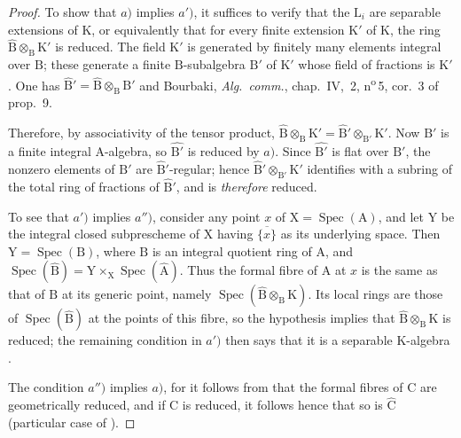 \begin{proof}
\renewcommand{\qedsymbol}{}
To show that $a)$ implies $a')$, it suffices to verify that the $\mathrm{L}_i$ are separable extensions of $\mathrm{K}$, or equivalently  that for every finite extension $\mathrm{K}'$ of $\mathrm{K}$, the ring $\widehat{\mathrm{B}}\otimes_\mathrm{B}\mathrm{K}'$ is reduced. The field $\mathrm{K}'$ is generated by finitely many elements integral over $\mathrm{B}$; these generate a finite $\mathrm{B}$-subalgebra $\mathrm{B}'$ of $\mathrm{K}'$ whose field of fractions is $\mathrm{K}'$. One has $\widehat{\mathrm{B}}'=\widehat{\mathrm{B}}\otimes_\mathrm{B}\mathrm{B}'$
 and Bourbaki, \emph{Alg.\ comm.}, chap.~IV, \textsection\,2, n\textsuperscript{o}\,5, cor.~3 of prop.~9.


Therefore, by associativity of the tensor product, $\widehat{\mathrm{B}}\otimes_\mathrm{B}\mathrm{K}'
=\widehat{\mathrm{B}}'\otimes_{\mathrm{B}'}\mathrm{K}'$.
Now $\mathrm{B}'$ is a finite integral $\mathrm{A}$-algebra, so $\widehat{\mathrm{B}'}$ is reduced by $a)$. Since $\widehat{\mathrm{B}'}$ is flat over $\mathrm{B}'$, the nonzero elements of $\mathrm{B}'$ are $\widehat{\mathrm{B}}'$-regular; hence $\widehat{\mathrm{B}}'\otimes_{\mathrm{B}'}\mathrm{K}'$ identifies with a subring of the total ring of fractions of $\widehat{\mathrm{B}}'$, and is \emph{therefore} reduced.

To see that $a')$ implies $a'')$, consider any point $x$ of $\mathrm{X}=\operatorname{Spec}(\mathrm{A})$, and let $\mathrm{Y}$ be the integral closed subprescheme of $\mathrm{X}$ having $\overline{\{x\}}$ as its underlying space. Then $\mathrm{Y}=\operatorname{Spec}(\mathrm{B})$, where $\mathrm{B}$ is an integral quotient ring of $\mathrm{A}$, and $\operatorname{Spec}(\widehat{\mathrm{B}})=\mathrm{Y}\times_\mathrm{X}\operatorname{Spec}(\widehat{\mathrm{A}})$. Thus the formal fibre of $\mathrm{A}$ at $x$ is the same as that of $\mathrm{B}$ at its generic point, namely $\operatorname{Spec}(\widehat{\mathrm{B}}\otimes_\mathrm{B}\mathrm{K})$. Its local rings are those of $\operatorname{Spec}(\widehat{\mathrm{B}})$ at the points of this fibre, so the hypothesis implies that $\widehat{\mathrm{B}}\otimes_\mathrm{B}\mathrm{K}$ is reduced; the remaining condition in $a')$ then says that it is a separable $\mathrm{K}$-algebra .

The condition $a'')$ implies $a)$, for it follows from  that the formal fibres of $\mathrm{C}$ are geometrically reduced, and if $\mathrm{C}$ is reduced, it follows hence that so is $\widehat{\mathrm{C}}$ (particular case of ).


\end{proof}
